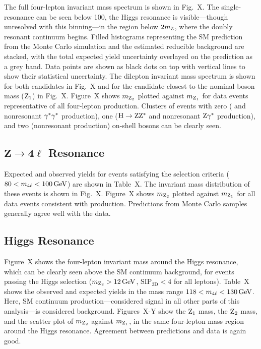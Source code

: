The full four-lepton invariant mass spectrum is shown in Fig.~X.
The single-{\PZ} resonance can be seen below {100\GeV}, the Higgs resonance is visible---though unresolved with this binning---in the {\Zgs} region below $2m_\mathrm{Z}$, where the doubly resonant {\ZZ} continuum begins.
Filled histograms representing the SM prediction from the Monte Carlo simulation and the estimated reducible background are stacked, with the total expected yield uncertainty overlayed on the prediction as a grey band.
Data points are shown as black dots on top with vertical lines to show their statistical uncertainty.
The dilepton invariant mass spectrum is shown for both {\Zgs} candidates in Fig.~X and for the {\Zgs} candidate closest to the nominal {\PZ} boson mass ($\mathrm{Z}_1$) in Fig.~X.
Figure~X shows $m_{\mathrm{Z}_2}$ plotted against $m_{\mathrm{Z}_1}$ for data events representative of all four-lepton production.
Clusters of events with zero ({\Zfourl} and nonresonant $\mathrm{\gamma}^\ast \mathrm{\gamma}^\ast$ production), one ($\mathrm{H} \to \mathrm{Z}\mathrm{Z}^\ast$ and nonresonant $\mathrm{Z}\mathrm{\gamma}^\ast$ production), and two (nonresonant {\ZZ} production) on-shell {\PZ} bosons can be clearly seen.


\subsection[\texorpdfstring{$\mathrm{Z} \to 4\ell$}{Z to 4l} Resonance]{$\mathbf{Z} \to \mathbf{4\ell}$ Resonance}

Expected and observed yields for events satisfying the {\Zfourl} selection criteria ($80 < m_{4\ell} < 100\,\mathrm{Ge\hspace{-.08em}V}$) are shown in Table~X.
The invariant mass distribution of these events is shown in Fig.~X.
Figure~X shows $m_{\mathrm{Z}_2}$ plotted against $m_{\mathrm{Z}_1}$ for all data events consistent with {\Zfourl} production.
Predictions from Monte Carlo samples generally agree well with the data.


\subsection{Higgs Resonance}

Figure~X shows the four-lepton invariant mass around the Higgs resonance, which can be clearly seen above the SM continuum background, for events passing the Higgs selection ($m_{\mathrm{Z}_2} > 12\,\mathrm{Ge\hspace{-.08em}V}$, $\text{SIP}_\text{3D} < 4$ for all leptons).
Table~X shows the observed and expected yields in the mass range $118 < m_{4\ell} < 130\,\mathrm{Ge\hspace{-.08em}V}$.
Here, SM continuum production---considered signal in all other parts of this analysis---is considered background.
Figures~X-Y show the $\mathrm{Z}_1$ mass, the $\mathrm{Z}_2$ mass, and the scatter plot of $m_{\mathrm{Z}_2}$ against $m_{\mathrm{Z}_1}$, in the same four-lepton mass region around the Higgs resonance.
Agreement between predictions and data is again good.


